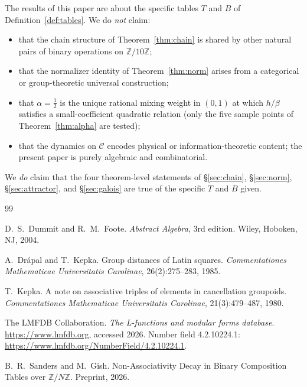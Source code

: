 \documentclass[11pt,reqno]{amsart}
\theoremstyle{plain}
\theoremstyle{definition}
\theoremstyle{remark}
\newcommand{\Z}{\mathbb{Z}}
\newcommand{\Zten}{\Z/10\Z}
\newcommand{\Cfour}{\mathcal{C}}
\begin{document}
The results of this paper are about the specific tables $T$ and
$B$ of Definition~\ref{def:tables}. We do \emph{not} claim:
\begin{itemize}\setlength\itemsep{0pt}
\item that the chain structure of Theorem~\ref{thm:chain} is
shared by other natural pairs of binary operations on $\Zten$;
\item that the normalizer identity of Theorem~\ref{thm:norm}
arises from a categorical or group-theoretic universal
construction;
\item that $\alpha=\tfrac12$ is the unique rational mixing weight
in $(0,1)$ at which $h/\beta$ satisfies a small-coefficient
quadratic relation (only the five sample points of
Theorem~\ref{thm:alpha} are tested);
\item that the dynamics on $\Cfour$ encodes physical or
information-theoretic content; the present paper is purely
algebraic and combinatorial.
\end{itemize}

We \emph{do} claim that the four theorem-level statements of
\S\ref{sec:chain}, \S\ref{sec:norm}, \S\ref{sec:attractor}, and
\S\ref{sec:galois} are true of the specific $T$ and $B$ given.

\begin{thebibliography}{99}

D.~S.~Dummit and R.~M.~Foote.
\newblock \emph{Abstract Algebra}, 3rd edition.
\newblock Wiley, Hoboken, NJ, 2004.

A.~Dr\'{a}pal and T.~Kepka.
\newblock Group distances of Latin squares.
\newblock \emph{Commentationes Mathematicae Universitatis Carolinae},
26(2):275--283, 1985.

T.~Kepka.
\newblock A note on associative triples of elements in cancellation groupoids.
\newblock \emph{Commentationes Mathematicae Universitatis Carolinae},
21(3):479--487, 1980.

The LMFDB Collaboration.
\newblock \emph{The L-functions and modular forms database}.
\newblock \url{https://www.lmfdb.org}, accessed 2026.
\newblock Number field 4.2.10224.1:
\url{https://www.lmfdb.org/NumberField/4.2.10224.1}.

B.~R.~Sanders and M.~Gish.
\newblock Non-Associativity Decay in Binary Composition Tables over
$\mathbb{Z}/N\mathbb{Z}$.
\newblock Preprint, 2026.

\end{thebibliography}
\end{document}
